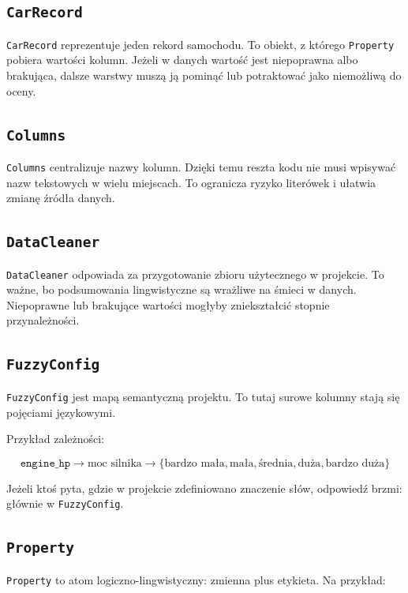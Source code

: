 \documentclass[11pt,a4paper]{article}
\newcommand{\code}[1]{\texttt{#1}}
\begin{document}
\subsection{\code{CarRecord}}

\code{CarRecord} reprezentuje jeden rekord samochodu. To obiekt, z którego \code{Property} pobiera wartości kolumn. Jeżeli w danych wartość jest niepoprawna albo brakująca, dalsze warstwy muszą ją pominąć lub potraktować jako niemożliwą do oceny.

\subsection{\code{Columns}}

\code{Columns} centralizuje nazwy kolumn. Dzięki temu reszta kodu nie musi wpisywać nazw tekstowych w wielu miejscach. To ogranicza ryzyko literówek i ułatwia zmianę źródła danych.

\subsection{\code{DataCleaner}}

\code{DataCleaner} odpowiada za przygotowanie zbioru użytecznego w projekcie. To ważne, bo podsumowania lingwistyczne są wrażliwe na śmieci w danych. Niepoprawne lub brakujące wartości mogłyby zniekształcić stopnie przynależności.

\subsection{\code{FuzzyConfig}}

\code{FuzzyConfig} jest mapą semantyczną projektu. To tutaj surowe kolumny stają się pojęciami językowymi.

Przykład zależności:

\[
\code{engine\_hp} \rightarrow \text{moc silnika} \rightarrow
\{\text{bardzo mała}, \text{mała}, \text{średnia}, \text{duża}, \text{bardzo duża}\}
\]

Jeżeli ktoś pyta, gdzie w projekcie zdefiniowano znaczenie słów, odpowiedź brzmi: głównie w \code{FuzzyConfig}.

\subsection{\code{Property}}

\code{Property} to atom logiczno-lingwistyczny: zmienna plus etykieta. Na przykład:
\end{document}

